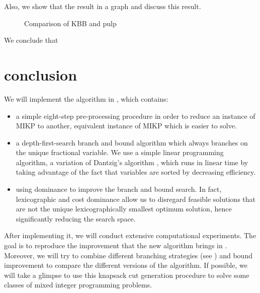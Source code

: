 \documentclass[a4paper,11pt]{article}
\begin{document}
Also, we show that the result in a graph and discuss this result.
\begin{figure}[H]
\begin{center}
\end{center}
\caption{Comparison of KBB and pulp \label{numfigd}}
\end{figure}

We conclude that

\section{conclusion}
We will implement the algorithm in \cite{fukasawa2011exact}, which contains:
\begin{itemize}
\item a simple eight-step pre-processing procedure in order to reduce an instance of MIKP to another, equivalent
instance of MIKP which is easier to solve.
\item a depth-first-search branch and bound algorithm which always branches on the unique fractional variable. We use a simple 
linear programming algorithm, a variation of Dantzig’s algorithm \cite{dantzig1957discrete}, which runs in linear time by taking advantage 
of the fact that variables are sorted by decreasing efficiency.
\item using dominance to improve the branch and bound search. In fact, lexicographic and cost dominance allow us to disregard feasible 
solutions that are not the unique lexicographically smallest optimum solution, hence significantly reducing the search space.
\end{itemize}
After implementing it, we will conduct extensive computational experiments. The goal is to reproduce the improvement that the new algorithm 
brings in \cite{fukasawa2011exact}. Moreover, we will try to combine different branching strategies (see \cite{linderoth2005noncommercial}) and 
bound improvement to compare the different versions of the algorithm. If possible, we will take a glimpse to use this knapsack cut generation 
procedure to solve some classes of mixed integer programming problems.

 

 
\end{document}
